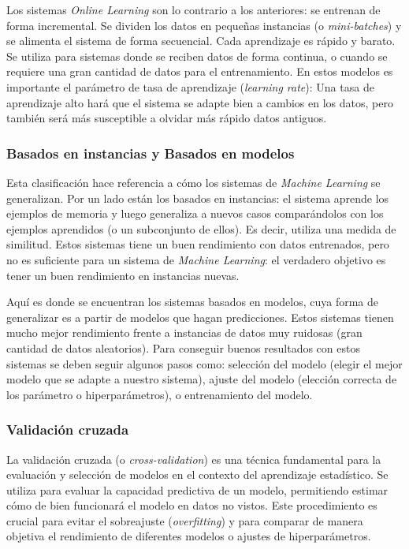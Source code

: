 \documentclass[12pt,a4paper,Spanish]{article}
\begin{document}
Los sistemas \textit{Online Learning} son lo contrario a los anteriores: se entrenan de forma incremental. Se dividen los datos en pequeñas instancias (o \textit{mini-batches}) y se alimenta el sistema de forma secuencial. Cada aprendizaje es rápido y barato. Se utiliza para sistemas donde se reciben datos de forma continua, o cuando se requiere una gran cantidad de datos para el entrenamiento. En estos modelos es importante el parámetro de tasa de aprendizaje (\textit{learning rate}): Una tasa de aprendizaje alto hará que el sistema se adapte bien a cambios en los datos, pero también será más susceptible a olvidar más rápido datos antiguos.


\subsubsection{Basados en instancias y Basados en modelos}
Esta clasificación hace referencia a cómo los sistemas de \textit{Machine Learning} se generalizan. Por un lado están los basados en instancias: el sistema aprende los ejemplos de memoria y luego generaliza a nuevos casos comparándolos con los ejemplos aprendidos (o un subconjunto de
ellos). Es decir, utiliza una medida de similitud. Estos sistemas tiene un buen rendimiento con datos entrenados, pero no es suficiente para un sistema de \textit{Machine Learning}: el verdadero objetivo es tener un buen rendimiento en instancias nuevas.
\newline

Aquí es donde se encuentran los sistemas basados en modelos, cuya forma de generalizar es a partir de modelos que hagan predicciones. Estos sistemas tienen mucho mejor rendimiento frente a instancias de datos muy ruidosas (gran cantidad de datos aleatorios). Para conseguir buenos resultados con estos sistemas se deben seguir algunos pasos como: selección del modelo (elegir el mejor modelo que se adapte a nuestro sistema), ajuste del modelo (elección correcta de los parámetro o hiperparámetros),  o entrenamiento del modelo.

\subsubsection{Validación cruzada}\label{cross-validation}
La validación cruzada (o \textit{cross-validation}) es una técnica fundamental para la evaluación y selección de modelos en el contexto del aprendizaje estadístico. Se utiliza para evaluar la capacidad predictiva de un modelo, permitiendo estimar cómo de bien funcionará el modelo en datos no vistos. Este procedimiento es crucial para evitar el sobreajuste (\textit{overfitting}) y para comparar de manera objetiva el rendimiento de diferentes modelos o ajustes de hiperparámetros.
\newline
\end{document}
